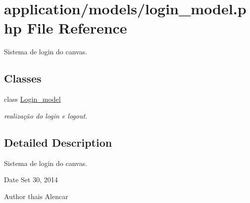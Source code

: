 \hypertarget{login__model_8php}{\section{application/models/login\-\_\-model.php File Reference}
\label{login__model_8php}
}


Sistema de login do canvas.  


\subsection*{Classes}
\begin{DoxyCompactItemize}
\item 
class \hyperlink{classLogin__model}{Login\-\_\-model}
\begin{DoxyCompactList}\small\item\em realização do login e logout. \end{DoxyCompactList}\end{DoxyCompactItemize}


\subsection{Detailed Description}
Sistema de login do canvas. \begin{DoxyDate}{Date}
Set 30, 2014 
\end{DoxyDate}
\begin{DoxyAuthor}{Author}
thais Alencar 
\end{DoxyAuthor}
